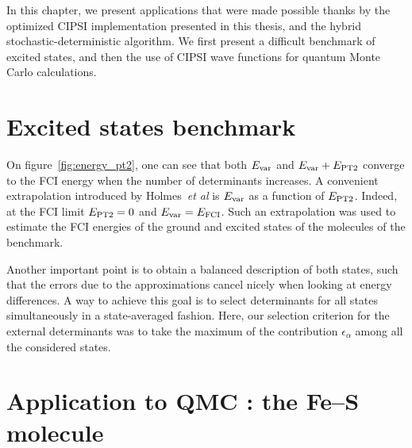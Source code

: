\documentclass[./thesis.tex]{subfiles}
\begin{document}
\label{chap:APPLICATIONS}

In this chapter, we present applications that were made possible thanks by
the optimized CIPSI implementation presented in this thesis, and the hybrid
stochastic-deterministic algorithm. 
We first present a difficult benchmark of excited states, and then the use
of CIPSI wave functions for quantum Monte Carlo calculations.

\section{Excited states benchmark}

On figure~\ref{fig:energy_pt2}, one can see that both $E_\text{var}$ and $E_\text{var}+E_\text{PT2}$
converge to the FCI energy when the number of determinants increases. A
convenient extrapolation introduced by Holmes~\textit{et al}\cite{Holmes_2017} is $E_\text{var}$ as a
function of $E_\text{PT2}$. Indeed, at the FCI limit $E_\text{PT2}=0$ and $E_\text{var}=E_\text{FCI}$.  Such
an extrapolation was used to estimate the FCI energies of the ground and
excited states of the molecules of the benchmark.

Another important point is to obtain a balanced description of both states,
such that the errors due to the approximations cancel nicely when looking at
energy differences. A way to achieve this goal is to select determinants for all
states simultaneously in a state-averaged fashion. Here, our selection criterion
for the external determinants was to take the maximum of the contribution
$\epsilon_\alpha$ among all the considered states.



\section{Application to QMC : the Fe--S molecule}
\end{document}
